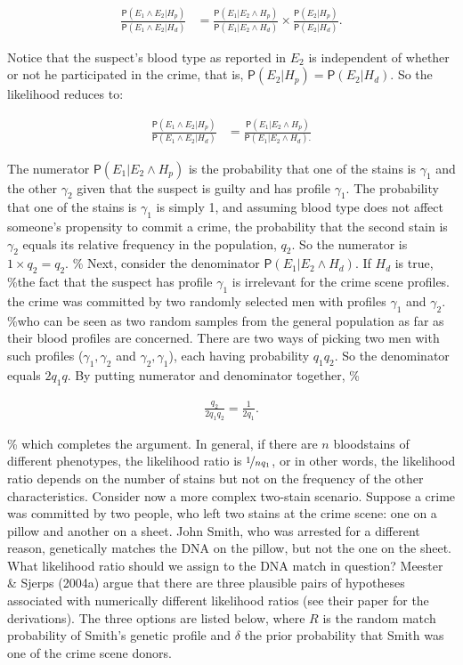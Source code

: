 \documentclass[10pt,dvipsnames,enabledeprecatedfontcommands]{scrartcl}
\newcommand{\pr}[1]{\mathsf{P}(#1)}
\begin{document}
\begin{align*}
\frac{\pr{E_1\wedge E_2\vert H_p}}{
    \pr{E_1\wedge E_2\vert H_d}} & = \frac{\pr{E_1 \vert E_2 \wedge H_p}}{
    \pr{E_1 \vert E_2 \wedge H_d}
    }\times 
 \frac{\pr{E_2\vert H_p}}{\pr{E_2 \vert H_d}}. 
 \end{align*}

\noindent Notice that the suspect's blood type as reported in \(E_2\) is
independent of whether or not he participated in the crime, that is,
\(\pr{E_2\vert H_p}=\pr{E_2 \vert H_d}\). So the likelihood reduces to:

\begin{align*}
 \frac{\pr{E_1\wedge E_2\vert H_p}}{
    \pr{E_1\wedge E_2\vert H_d}} & = \frac{\pr{E_1 \vert E_2 \wedge H_p}}{
    \pr{E_1 \vert E_2 \wedge H_d}.
 } 
 \end{align*}

\noindent
 The numerator \(\pr{E_1 \vert E_2 \wedge H_p}\) is the probability that
one of the stains is \(\gamma_1\) and the other \(\gamma_2\) given that
the suspect is guilty and has profile \(\gamma_1\). The probability that
one of the stains is \(\gamma_1\) is simply 1, and assuming blood type
does not affect someone's propensity to commit a crime, the probability
that the second stain is \(\gamma_2\) equals its relative frequency in
the population, \(q_2\). So the numerator is \(1\times q_2 = q_2\). \%
Next, consider the denominator \(\pr{E_1 \vert E_2 \wedge H_d}\). If
\(H_d\) is true, \%the fact that the suspect has profile \(\gamma_1\) is
irrelevant for the crime scene profiles. the crime was committed by two
randomly selected men with profiles \(\gamma_1\) and \(\gamma_2\). \%who
can be seen as two random samples from the general population as far as
their blood profiles are concerned. There are two ways of picking two
men with such profiles (\(\gamma_1,\gamma_2\) and
\(\gamma_2,\gamma_1\)), each having probability \(q_1q_2\). So the
denominator equals \(2q_1q\). By putting numerator and denominator
together, \%

\begin{align*}
 \frac{q_2}{2q_1q_2} = \frac{1}{2q_1}. 
 \end{align*}

\% \noindent which completes the argument. In general, if there are
\(n\) bloodstains of different phenotypes, the likelihood ratio is
\(\nicefrac{1}{nq_1}\), or in other words, the likelihood ratio depends
on the number of stains but not on the frequency of the other
characteristics. Consider now a more complex two-stain scenario. Suppose
a crime was committed by two people, who left two stains at the crime
scene: one on a pillow and another on a sheet. John Smith, who was
arrested for a different reason, genetically matches the DNA on the
pillow, but not the one on the sheet. What likelihood ratio should we
assign to the DNA match in question? Meester \& Sjerps (2004a) argue
that there are three plausible pairs of hypotheses associated with
numerically different likelihood ratios (see their paper for the
derivations). The three options are listed below, where \(R\) is the
random match probability of Smith's genetic profile and \(\delta\) the
prior probability that Smith was one of the crime scene donors.
\vspace{2mm}
\end{document}
